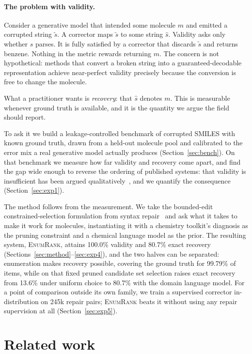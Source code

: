 \documentclass[11pt]{article}
\newcommand{\ours}{\textsc{EnumRank}}
\begin{document}
\paragraph{The problem with validity.}
Consider a generative model that intended some molecule $m$ and emitted a
corrupted string $\tilde{s}$. A corrector maps $\tilde{s}$ to some string
$\hat{s}$. Validity asks only whether $\hat{s}$ parses. It is fully satisfied by
a corrector that discards $\tilde{s}$ and returns benzene. Nothing in the metric
rewards returning $m$. The concern is not hypothetical: methods that convert a
broken string into a guaranteed-decodable representation achieve near-perfect
validity precisely because the conversion is free to change the molecule.

What a practitioner wants is \emph{recovery}: that $\hat{s}$ denotes $m$. This
is measurable whenever ground truth is available, and it is the quantity we
argue the field should report.

To ask it we build a leakage-controlled benchmark of corrupted SMILES with known
ground truth, drawn from a held-out molecule pool and calibrated to the error mix
a real generative model actually produces (Section~\ref{sec:bench}). On that
benchmark we measure how far validity and recovery come apart, and find the gap
wide enough to reverse the ordering of published systems: that validity is
insufficient has been argued qualitatively~\citep{amrec}, and we quantify the
consequence (Section~\ref{sec:exp1}).

The method follows from the measurement. We take the bounded-edit
constrained-selection formulation from syntax repair~\citep{considine2025syntax}
and ask what it takes to make it work for molecules, instantiating it with a
chemistry toolkit's diagnosis as the pruning constraint and a chemical language
model as the prior. The resulting system, \ours{}, attains 100.0\% validity and
80.7\% exact recovery (Sections~\ref{sec:method}--\ref{sec:exp4}), and the two
halves can be separated: enumeration makes recovery possible, covering the
ground truth for 99.79\% of items, while on that fixed pruned candidate set
selection raises exact recovery from 13.6\% under uniform choice to 80.7\% with
the domain language model. For a point of comparison outside its own family, we
train a supervised corrector in-distribution on 245k repair pairs; \ours{} beats
it without using any repair supervision at all (Section~\ref{sec:exp5}).

\section{Related work}
\end{document}
